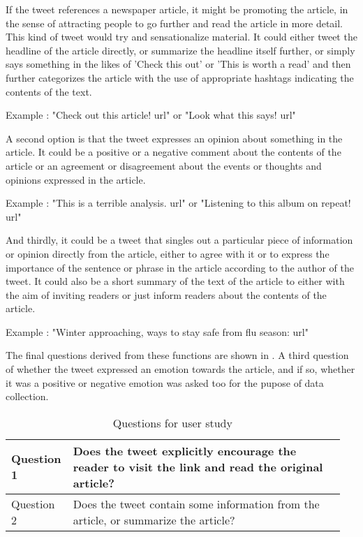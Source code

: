 If the tweet references a newspaper article, it might be promoting the article, in the sense of attracting people to go further and read the article in more detail. This kind of tweet would try and sensationalize material. It could either tweet the headline of the article directly, or summarize the headline itself further, or simply says something in the likes of 'Check this out' or 'This is worth a read' and then further categorizes the article with the use of appropriate hashtags indicating the contents of the text.

Example : "Check out this article! {url}" or "Look what this says! {url}"

A second option is that the tweet expresses an opinion about something in the article. It could be a positive or a negative comment about the contents of the article or an agreement or disagreement about the events or thoughts and opinions expressed in the article. 

Example : "This is a terrible analysis. {url}" or "Listening to this album on repeat! {url}"

And thirdly, it could be a tweet that singles out a particular piece of information or opinion directly from the article, either to agree with it or to express the importance of the sentence or phrase in the article according to the author of the tweet. It could also be a short summary of the text of the article to either with the aim of inviting readers or just inform readers about the contents of the article.

Example : "Winter approaching, ways to stay safe from flu season: {url}"

The final questions derived from these functions are shown in . A third question of whether the tweet expressed an emotion towards the article, and if so, whether it was a positive or negative emotion was asked too for the pupose of data collection. 

\begin{table}[!htbp]
\centering
\caption{Questions for user study}
\label{tab:mturkqs}
\begin{tabular}{|p{0.15\linewidth}|p{0.8\linewidth}|}
\hline
Question 1 & Does the tweet explicitly encourage the reader to visit the link and read the original article? \\ \hline
Question 2 & Does the tweet contain some information from the article, or summarize the article?             \\ \hline
\end{tabular}
\end{table} 

